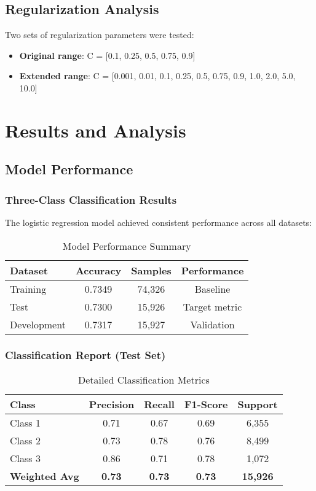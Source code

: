 \documentclass[12pt,a4paper]{article}
\begin{document}
\subsection{Regularization Analysis}
Two sets of regularization parameters were tested:
\begin{itemize}
    \item \textbf{Original range}: C = [0.1, 0.25, 0.5, 0.75, 0.9]
    \item \textbf{Extended range}: C = [0.001, 0.01, 0.1, 0.25, 0.5, 0.75, 0.9, 1.0, 2.0, 5.0, 10.0]
\end{itemize}

\section{Results and Analysis}

\subsection{Model Performance}

\subsubsection{Three-Class Classification Results}
The logistic regression model achieved consistent performance across all datasets:

\begin{table}[H]
\centering
\caption{Model Performance Summary}
\begin{tabular}{@{}lccc@{}}
\toprule
\textbf{Dataset} & \textbf{Accuracy} & \textbf{Samples} & \textbf{Performance} \\
\midrule
Training & 0.7349 & 74,326 & Baseline \\
Test & 0.7300 & 15,926 & Target metric \\
Development & 0.7317 & 15,927 & Validation \\
\bottomrule
\end{tabular}
\end{table}

\subsubsection{Classification Report (Test Set)}
\begin{table}[H]
\centering
\caption{Detailed Classification Metrics}
\begin{tabular}{@{}lcccc@{}}
\toprule
\textbf{Class} & \textbf{Precision} & \textbf{Recall} & \textbf{F1-Score} & \textbf{Support} \\
\midrule
Class 1 & 0.71 & 0.67 & 0.69 & 6,355 \\
Class 2 & 0.73 & 0.78 & 0.76 & 8,499 \\
Class 3 & 0.86 & 0.71 & 0.78 & 1,072 \\
\midrule
\textbf{Weighted Avg} & \textbf{0.73} & \textbf{0.73} & \textbf{0.73} & \textbf{15,926} \\
\bottomrule
\end{tabular}
\end{table}
\end{document}

